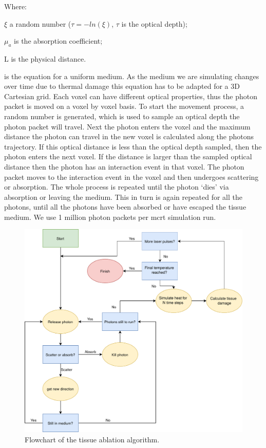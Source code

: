 \noindent Where:

\indent $\xi$ a random number ($\tau = -ln(\xi)$, $\tau$ is the optical depth);

\indent $\mu_a$ is the absorption coefficient;

\indent L is the physical distance.

\medskip

 is the equation for a uniform medium. As the medium we are simulating changes over time due to thermal damage this equation has to be adapted for a 3D Cartesian grid. Each voxel 
can have different optical properties, thus the photon packet is moved on a voxel by voxel basis. To start the movement process, a random number is generated, which is used to sample an optical depth the photon packet will travel. Next the photon enters the voxel and the maximum distance the photon can travel in the new voxel is calculated along the photons trajectory. If this optical distance is less than the optical depth sampled, then the photon enters the next voxel. If the distance is larger than the sampled optical distance then the photon has an interaction event in that voxel. The photon packet moves to the interaction event in the voxel and then undergoes scattering or absorption. The whole process is repeated until the photon `dies' via absorption or leaving the medium.
This in turn is again repeated for all the photons, until all the photons have been absorbed or have escaped the tissue medium. We use 1 million photon packets per \gls{mcrt} simulation run.

\begin{figure}
\centering
\includegraphics[scale=0.5]{./ablation/images/flowchart.pdf}
\caption{Flowchart of the tissue ablation algorithm.}
\label{fig:algo}
\end{figure}

